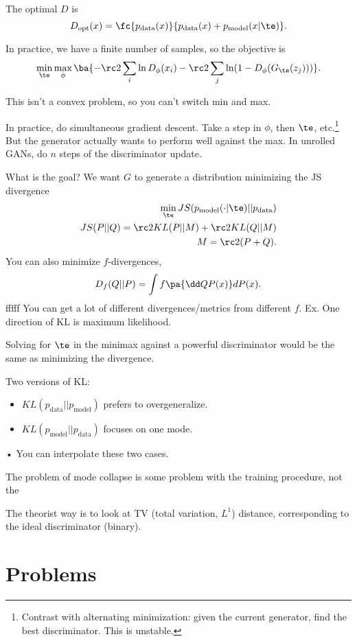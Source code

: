 The optimal $D$ is
$$
D_{\text{opt}}(x) = \fc{p_{\text{data}}(x)}{p_{\text{data}}(x) + p_{\text{model}}(x|\te)}.
$$

In practice, we have a finite number of samples, so the objective is 
$$
\min_\te \max_\phi
\ba{
-\rc 2\sum_i \ln D_\phi(x_i) - \rc 2 \sum_j \ln (1-D_\phi(G_\te(z_j)))}.
$$

This isn't a convex problem, so you can't switch min and max.

In practice, do simultaneous gradient descent. Take a step in $\phi$, then $\te$, etc.\footnote{Contrast with alternating minimization: given the current generator, find the best discriminator. This is unstable. 
}
 But the %
generator actually wants to perform well against the max.  In unrolled GANs, do $n$ steps of the discriminator update.

What is the goal? We want $G$ to generate a distribution minimizing the JS divergence
\begin{align}
\min_\te JS(p_{\text{model}}(\cdot |\te)||p_{\text{data}})\\
JS(P||Q) =\rc 2KL(P||M) + \rc2 KL(Q||M)\\
M=\rc2 (P+Q).
\end{align}
You can also minimize $f$-divergences,
$$
D_f (Q||P) = \int f\pa{\dd QP(x)}dP(x).
$$fffff
You can get a lot of different divergences/metrics from different $f$.
Ex. One direction of KL is maximum likelihood.

Solving for $\te$ in the minimax against a powerful discriminator would be the same as minimizing the divergence.

Two versions of KL:
\begin{itemize}
\item
$KL(p_{\text{data}}||p_{\text{model}})$ prefers to overgeneralize. 
\item
$KL(p_{\text{model}}||p_{\text{data}})$ focuses on one mode.
\end{itemize}•
You can interpolate these two cases.

The problem of mode collapse is some problem with the training procedure, not the

The theorist way is to look at TV (total variation, $L^1$) distance, corresponding to the ideal discriminator (binary).

\section{Problems}
